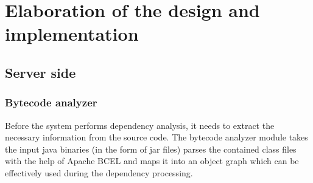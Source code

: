 \chapter{Elaboration of the design and implementation}


\section{Server side}\label{sect:elabserver}


\subsection{Bytecode analyzer}\label{sect:bcanalyzer}
Before the system performs dependency analysis, it needs to extract the
necessary information from the source code.
The bytecode analyzer module takes the input java binaries (in the form of jar
files) parses the contained class files with the help of Apache BCEL and maps it
into an object graph which can be effectively used during the dependency
processing.

